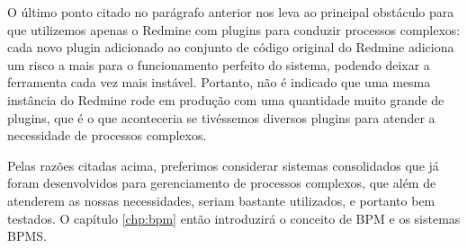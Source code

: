 O último ponto citado no parágrafo anterior nos leva ao principal obstáculo para que utilizemos apenas o Redmine com plugins para conduzir processos complexos: cada novo plugin adicionado ao conjunto de código original do Redmine adiciona um risco a mais para o funcionamento perfeito do sistema, podendo deixar a ferramenta cada vez mais instável. Portanto, não é indicado que uma mesma instância do Redmine rode em produção com uma quantidade muito grande de plugins, que é o que aconteceria se tivéssemos diversos plugins para atender a necessidade de processos complexos.

Pelas razões citadas acima, preferimos considerar sistemas consolidados que já foram desenvolvidos para gerenciamento de processos complexos, que além de atenderem as nossas necessidades, seriam bastante utilizados, e portanto bem testados. O capítulo \ref{chp:bpm} então introduzirá o conceito de BPM e os sistemas BPMS.